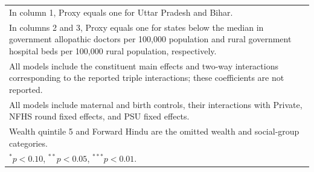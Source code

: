 {\begin{tabular}{l*{3}{c}}
\multicolumn{4}{l}{\footnotesize In column 1, Proxy equals one for Uttar Pradesh and Bihar.}\\
\multicolumn{4}{l}{\footnotesize In columns 2 and 3, Proxy equals one for states below the median in government allopathic doctors per 100,000 population and rural government hospital beds per 100,000 rural population, respectively.}\\
\multicolumn{4}{l}{\footnotesize All models include the constituent main effects and two-way interactions corresponding to the reported triple interactions; these coefficients are not reported.}\\
\multicolumn{4}{l}{\footnotesize All models include maternal and birth controls, their interactions with Private, NFHS round fixed effects, and PSU fixed effects.}\\
\multicolumn{4}{l}{\footnotesize Wealth quintile 5 and Forward Hindu are the omitted wealth and social-group categories.}\\
\multicolumn{4}{l}{\footnotesize $^{*}p<0.10$, $^{**}p<0.05$, $^{***}p<0.01$.}\\
\end{tabular}
}
